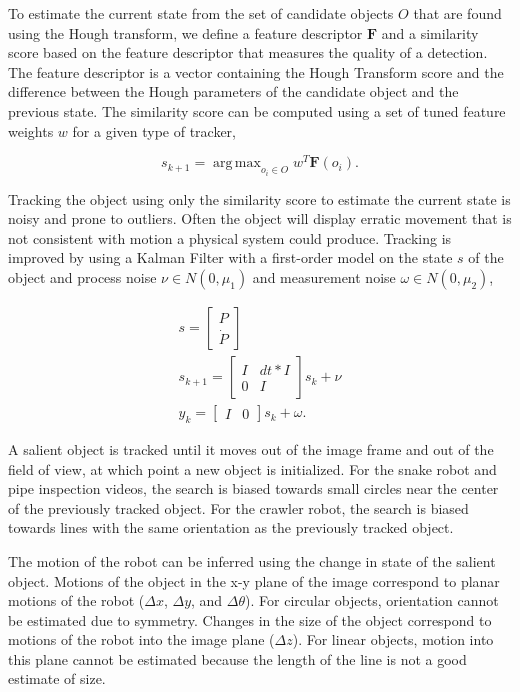 \documentclass[letterpaper, 10 pt, conference]{ieeeconf}
\DeclareMathOperator*{\argmax}{arg\,max}
\begin{document}
To estimate the current state from the set of candidate objects $O$ that are found using the Hough transform, we define a feature descriptor $\textbf{F}$ and a similarity score based on the feature descriptor that measures the quality of a detection. The feature descriptor is a vector containing the Hough Transform score and the difference between the Hough parameters of the candidate object and the previous state. The similarity score can be computed using a set of tuned feature weights $w$ for a given type of tracker,

\begin{equation}
	s_{k+1} = \argmax_{o_i \in O} w^T \textbf{F}(o_i).
\end{equation}

Tracking the object using only the similarity score to estimate the current state is noisy and prone to outliers. Often the object will display erratic movement that is not consistent with motion a physical system could produce. Tracking is improved by using a Kalman Filter with a first-order model on the state $s$ of the object and process noise $\nu \in N(0, \mu_1)$ and measurement noise $\omega \in N(0, \mu_2)$,

\begin{eqnarray*}
s = \begin{bmatrix} P \\ \dot{P} \end{bmatrix} \\
s_{k+1} = \begin{bmatrix} I & dt * I \\ 0 & I \end{bmatrix} s_{k} + \nu \\
y_k = \begin{bmatrix} I & 0 \end{bmatrix} s_k + \omega.
\end{eqnarray*}


A salient object is tracked until it moves out of the image frame and out of the field of view, at which point a new object is initialized. For the snake robot and pipe inspection videos, the search is biased towards small circles near the center of the previously tracked object. For the crawler robot, the search is biased towards lines with the same orientation as the previously tracked object.

The motion of the robot can be inferred using the change in state of the salient object. Motions of the object in the x-y plane of the image correspond to planar motions of the robot  ($\Delta x$, $\Delta y$, and $\Delta \theta$). For circular objects, orientation cannot be estimated due to symmetry. Changes in the size of the object correspond to motions of the robot into the image plane ($\Delta z$). For linear objects, motion into this plane cannot be estimated because the length of the line is not a good estimate of size.
\end{document}
